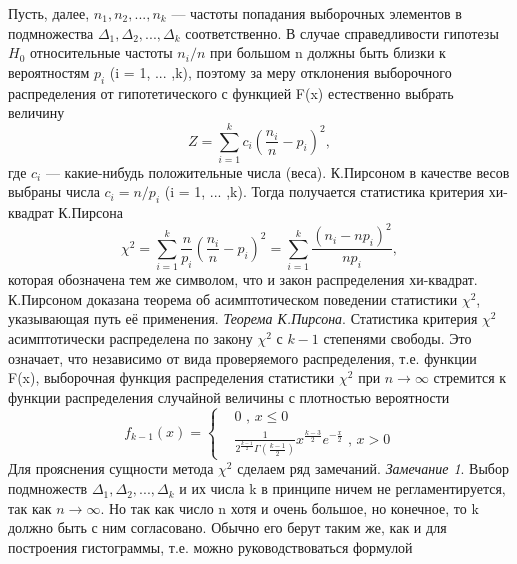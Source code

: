 \documentclass[12pt,a4paper]{scrartcl}
\begin{document}
    \newline
    Пусть, далее, $n_{1},n_{2}, ... ,n_{k}$ — частоты попадания выборочных элементов в подмножества $\Delta_{1},\Delta_{2}, ... ,\Delta_{k}$ соответственно.
    \newline
    В случае справедливости гипотезы $H_{0}$ относительные частоты $n_{i}/n$ при большом n должны быть близки к вероятностям $p_{i}$ (i = 1, ... ,k), поэтому за меру отклонения выборочного распределения от гипотетического с функцией F(x) естественно выбрать величину
    \begin{equation}
        Z = \sum_{i = 1}^{k}{c_{i}(\frac{n_{i}}{n} - p_{i})^{2}}, 
        \label{Z}
    \end{equation}
    где $c_{i}$ — какие-нибудь положительные числа (веса). К.Пирсоном в качестве весов выбраны числа $c_{i} = n/p_{i}$ (i = 1, ... ,k). Тогда получается статистика критерия хи-квадрат К.Пирсона
    \begin{equation}
        \chi^{2} = \sum_{i = 1}^{k}{\frac{n}{p_{i}}(\frac{n_{i}}{n} - p_{i})^{2}} = \sum_{i = 1}^{k}{\frac{(n_{i} - np_{i})^{2}}{np_{i}}}, 
        \label{chi_2}
    \end{equation}
    которая обозначена тем же символом, что и закон распределения хи-квадрат.
    \newline
    К.Пирсоном доказана теорема об асимптотическом поведении статистики $\chi^{2}$, указывающая путь её применения.
    \newline
    \textit{Теорема К.Пирсона}. Статистика критерия $\chi^{2}$ асимптотически распределена по закону $\chi^{2}$ с $k-1$ степенями свободы.
    \newline
    Это означает, что независимо от вида проверяемого распределения, т.е. функции F(x), выборочная функция распределения статистики $\chi^{2}$ при $n \rightarrow \infty$  стремится к функции распределения случайной величины с плотностью вероятности 
    \begin{equation}
        f_{k - 1}(x) = 
        \begin{cases}
            & 0 \text{ , } x  \leq 0  \\ 
            & \frac{1}{2^{\frac{k-1}{2}}\Gamma(\frac{k-1}{2})}x^{\frac{k-3}{2}}e^{-\frac{x}{2}}
            \text{ , } x>0 
        \end{cases}
        \label{f_k-1}
    \end{equation}
    Для прояснения сущности метода $\chi^{2}$ сделаем ряд замечаний.
    \newline
    \textit{Замечание 1}. Выбор подмножеств $\Delta_{1},\Delta_{2}, ... ,\Delta_{k}$ и их числа k в принципе ничем не регламентируется, так как $n \rightarrow \infty$. Но так как число n хотя и очень большое, но конечное, то k должно быть с ним согласовано. Обычно его берут таким же, как и для построения гистограммы, т.е. можно руководствоваться формулой
\end{document}
